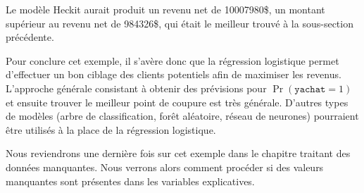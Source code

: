 \documentclass[
  11pt,
  letterpaper,
]{scrbook}
\newenvironment{Shaded}{\begin{snugshade}}{\end{snugshade}}
\newcommand{\AttributeTok}[1]{\textcolor[rgb]{0.40,0.45,0.13}{#1}}
\newcommand{\CommentTok}[1]{\textcolor[rgb]{0.37,0.37,0.37}{#1}}
\newcommand{\DecValTok}[1]{\textcolor[rgb]{0.68,0.00,0.00}{#1}}
\newcommand{\FunctionTok}[1]{\textcolor[rgb]{0.28,0.35,0.67}{#1}}
\newcommand{\NormalTok}[1]{\textcolor[rgb]{0.00,0.23,0.31}{#1}}
\newcommand{\OtherTok}[1]{\textcolor[rgb]{0.00,0.23,0.31}{#1}}
\newcommand{\SpecialCharTok}[1]{\textcolor[rgb]{0.37,0.37,0.37}{#1}}
\newcommand{\StringTok}[1]{\textcolor[rgb]{0.13,0.47,0.30}{#1}}
\theoremstyle{definition}
\theoremstyle{remark}
\begin{document}
\begin{Shaded}
\end{Shaded}

\begin{table}

\end{table}

Le modèle Heckit aurait produit un revenu net de 10007980\$, un montant
supérieur au revenu net de 984326\$, qui était le meilleur trouvé à la
sous-section précédente.

Pour conclure cet exemple, il s'avère donc que la régression logistique
permet d'effectuer un bon ciblage des clients potentiels afin de
maximiser les revenus. L'approche générale consistant à obtenir des
prévisions pour \(\Pr(\texttt{yachat}=1)\) et ensuite trouver le
meilleur point de coupure est très générale. D'autres types de modèles
(arbre de classification, forêt aléatoire, réseau de neurones)
pourraient être utilisés à la place de la régression logistique.

Nous reviendrons une dernière fois sur cet exemple dans le chapitre
traitant des données manquantes. Nous verrons alors comment procéder si
des valeurs manquantes sont présentes dans les variables explicatives.
\end{document}
